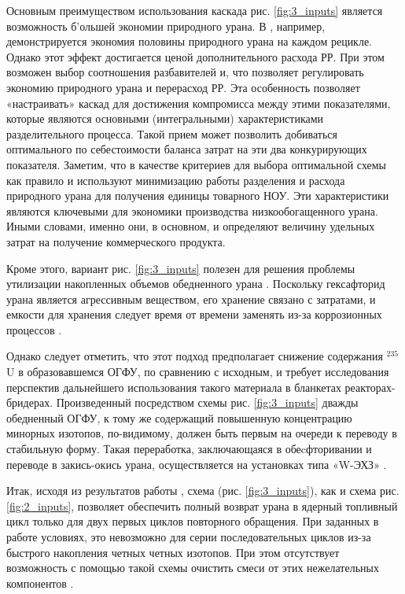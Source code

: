 Основным преимуществом использования каскада рис. \ref{fig:3_inputs} является возможность б'ольшей экономии природного урана.
В \cite{smirnovApplyingEnrichmentCapacities2018}, например, демонстрируется экономия половины природного урана на каждом рецикле.
Однако этот эффект достигается ценой дополнительного расхода РР. При этом возможен выбор соотношения разбавителей и, что позволяет регулировать экономию природного урана и перерасход РР.
Эта особенность позволяет «настраивать» каскад для достижения компромисса между этими показателями, которые являются основными (интегральными) характеристиками разделительного процесса.
Такой прием может позволить добиваться оптимального по себестоимости баланса затрат на эти два конкурирующих показателя.
Заметим, что в качестве критериев для выбора оптимальной схемы как правило и используют минимизацию работы разделения и расхода природного урана для получения единицы товарного НОУ. Эти характеристики являются ключевыми для экономики производства низкообогащенного урана. Иными словами, именно они, в основном, и определяют величину удельных затрат на получение коммерческого продукта.

Кроме этого, вариант рис. \ref{fig:3_inputs} полезен для решения проблемы утилизации накопленных объемов обедненного урана \cite{smirnovEnrichmentRegeneratedUranium2014}. Поскольку гексафторид урана является агрессивным веществом, его хранение связано с затратами, и емкости для хранения следует время от времени заменять из-за коррозионных процессов \cite{fitchOPTIONSDISPOSALREAPPLICATION2009, oecdManagementDepletedUranium2001}.

Однако следует отметить, что этот подход предполагает снижение содержания $^{235}$U в образовавшемся ОГФУ, по сравнению с исходным, и требует исследования перспектив дальнейшего использования такого материала в бланкетах реакторах-бридерах.
Произведенный посредством схемы рис. \ref{fig:3_inputs} дважды обедненный ОГФУ, к тому же содержащий повышенную концентрацию минорных изотопов, по-видимому, должен быть первым на очереди к переводу в стабильную форму. Такая переработка, заключающаяся в обеcфторивании и переводе в закись-окись урана, осуществляется на установках типа «W-ЭХЗ» \cite{PererabotkaOGFUObrazovaniem2014}.

Итак, исходя из результатов работы \cite{smirnovApplyingEnrichmentCapacities2018}, схема (рис. \ref{fig:3_inputs}), как и схема рис. \ref{fig:2_inputs}, позволяет обеспечить полный возврат урана в ядерный топливный цикл только для двух первых циклов повторного обращения.
При заданных в работе \cite{smirnovApplyingEnrichmentCapacities2018} условиях, это невозможно для серии последовательных циклов из-за быстрого накопления четных четных изотопов. При  этом отсутствует возможность с помощью такой схемы очистить смеси от этих нежелательных компонентов \cite{smirnovApplyingEnrichmentCapacities2018}.

